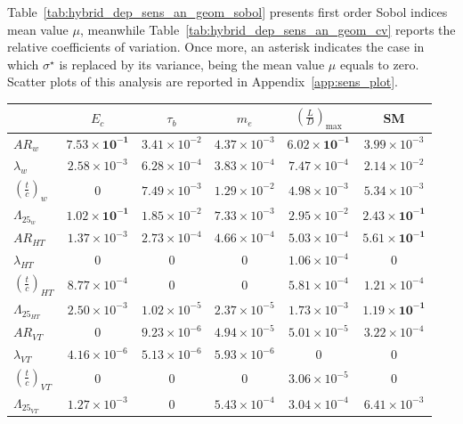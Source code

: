 Table~\ref{tab:hybrid_dep_sens_an_geom_sobol} presents first order Sobol indices mean value $\mu$, meanwhile Table~\ref{tab:hybrid_dep_sens_an_geom_cv} reports the relative coefficients of variation.
Once more, an asterisk indicates the case in which $\sigma^{\star}$ is replaced by its variance, being the mean value $\mu$ equals to zero. 
Scatter plots of this analysis are reported in Appendix~\ref{app:sens_plot}.
\begin{table}[!h]
	\centering
	\begin{tabular}{l c c c c c}
		\hline
		& $E_{c}$ & $\tau_{b}$ & $m_e$ & $\left(\frac{L}{D}\right)_{\max}$ & SM \\
		\hline
		$AR_w$ & $\mathbf{7.53\times10^{-1}}$ & $3.41\times10^{-2}$ & $4.37\times10^{-3}$ & $\mathbf{6.02\times10^{-1}}$ & $3.99\times10^{-3}$ \\
		$\lambda_{w}$ & $2.58\times10^{-3}$ & $6.28\times10^{-4}$ & $3.83\times10^{-4}$ & $7.47\times10^{-4}$ & $2.14\times10^{-2}$ \\
		$\left(\frac{t}{c}\right)_{w}$ & 0 & $7.49\times10^{-3}$ & $1.29\times10^{-2}$ & $4.98\times10^{-3}$ & $5.34\times10^{-3}$ \\
		$\Lambda_{25_{w}}$ & $\mathbf{1.02\times10^{-1}}$ & $1.85\times10^{-2}$ & $7.33\times10^{-3}$ & $2.95\times10^{-2}$ & $\mathbf{2.43\times10^{-1}}$\\
		
		$AR_{HT}$ & $1.37\times10^{-3}$ & $2.73\times10^{-4}$ & $4.66\times10^{-4}$ & $5.03\times10^{-4}$ & $\mathbf{5.61\times10^{-1}}$\\
		$\lambda_{HT}$ & 0 & 0 & 0 & $1.06\times10^{-4}$ & 0 \\
		$\left(\frac{t}{c}\right)_{HT}$ & $8.77\times10^{-4}$ & 0 & 0 & $5.81\times10^{-4}$ & $1.21\times10^{-4}$ \\
		$\Lambda_{25_{HT}}$ & $2.50\times10^{-3}$ & $1.02\times10^{-5}$ & $2.37\times10^{-5}$ & $1.73\times10^{-3}$ & $\mathbf{1.19\times10^{-1}}$ \\
		
		$AR_{VT}$ & 0 & $9.23\times10^{-6}$ & $4.94\times10^{-5}$ & $5.01\times10^{-5}$ & $3.22\times10^{-4}$ \\
		$\lambda_{VT}$ & $4.16\times10^{-6}$ & $5.13\times10^{-6}$ & $5.93\times10^{-6}$ & 0 & 0\\
		$\left(\frac{t}{c}\right)_{VT}$ & 0 & 0 & 0 & $3.06\times10^{-5}$ & 0 \\
		$\Lambda_{25_{VT}}$ & $1.27\times10^{-3}$ & 0 & $5.43\times10^{-4}$ & $3.04\times10^{-4}$ & $6.41\times10^{-3}$ \\
		

\end{tabular}
\end{table}
